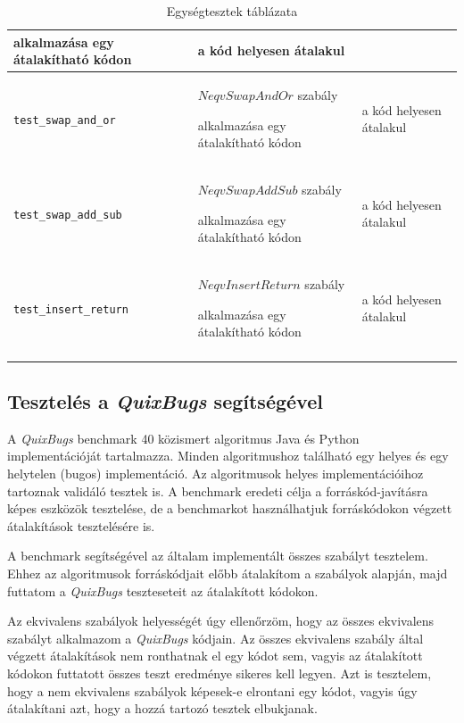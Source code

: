 \begin{center}
\begin{longtable}{ | p{} | p{} | p{} | }
		alkalmazása egy átalakítható kódon
		&
		a kód helyesen átalakul
		\\
		\hline

		\texttt{\lstinline{test_swap_and_or}}
		&
		$NeqvSwapAndOr$ szabály
		
		alkalmazása egy átalakítható kódon
		&
		a kód helyesen átalakul
		\\
		\hline

		\texttt{\lstinline{test_swap_add_sub}}
		&
		$NeqvSwapAddSub$ szabály
		
		alkalmazása egy átalakítható kódon
		&
		a kód helyesen átalakul
		\\
		\hline

		\texttt{\lstinline{test_insert_return}}
		&
		$NeqvInsertReturn$ szabály
		
		alkalmazása egy átalakítható kódon
		&
		a kód helyesen átalakul
		\\
		\hline

		\caption{Egységtesztek táblázata}
		\label{tab:unit_tests}
	\end{longtable}
\end{center}

\pagebreak

\subsection{Tesztelés a \emph{QuixBugs} segítségével\label{sec:QuixBugs}}

A \emph{QuixBugs} benchmark 40 közismert algoritmus Java és Python implementációját tartalmazza.
Minden algoritmushoz található egy helyes és egy helytelen (bugos) implementáció.
Az algoritmusok helyes implementációihoz tartoznak validáló tesztek is.
A benchmark eredeti célja a forráskód-javításra képes eszközök tesztelése,
de a benchmarkot használhatjuk forráskódokon végzett átalakítások tesztelésére is.

A benchmark segítségével az általam implementált összes szabályt tesztelem.
Ehhez az algoritmusok forráskódjait előbb átalakítom a szabályok alapján,
majd futtatom a \emph{QuixBugs} teszteseteit az átalakított kódokon.

Az ekvivalens szabályok helyességét úgy ellenőrzöm,
hogy az összes ekvivalens szabályt alkalmazom a \emph{QuixBugs} kódjain.
Az összes ekvivalens szabály által végzett átalakítások nem ronthatnak el egy kódot sem,
vagyis az átalakított kódokon futtatott összes teszt eredménye sikeres kell legyen.
Azt is tesztelem, hogy a nem ekvivalens szabályok képesek-e elrontani egy kódot,
vagyis úgy átalakítani azt, hogy a hozzá tartozó tesztek elbukjanak.

